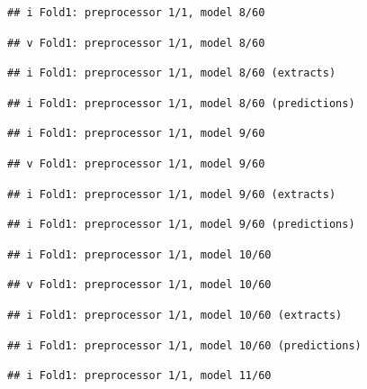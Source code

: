 \documentclass[
]{article}
\begin{document}
\begin{verbatim}
## i Fold1: preprocessor 1/1, model 8/60
\end{verbatim}

\begin{verbatim}
## v Fold1: preprocessor 1/1, model 8/60
\end{verbatim}

\begin{verbatim}
## i Fold1: preprocessor 1/1, model 8/60 (extracts)
\end{verbatim}

\begin{verbatim}
## i Fold1: preprocessor 1/1, model 8/60 (predictions)
\end{verbatim}

\begin{verbatim}
## i Fold1: preprocessor 1/1, model 9/60
\end{verbatim}

\begin{verbatim}
## v Fold1: preprocessor 1/1, model 9/60
\end{verbatim}

\begin{verbatim}
## i Fold1: preprocessor 1/1, model 9/60 (extracts)
\end{verbatim}

\begin{verbatim}
## i Fold1: preprocessor 1/1, model 9/60 (predictions)
\end{verbatim}

\begin{verbatim}
## i Fold1: preprocessor 1/1, model 10/60
\end{verbatim}

\begin{verbatim}
## v Fold1: preprocessor 1/1, model 10/60
\end{verbatim}

\begin{verbatim}
## i Fold1: preprocessor 1/1, model 10/60 (extracts)
\end{verbatim}

\begin{verbatim}
## i Fold1: preprocessor 1/1, model 10/60 (predictions)
\end{verbatim}

\begin{verbatim}
## i Fold1: preprocessor 1/1, model 11/60
\end{verbatim}
\end{document}
